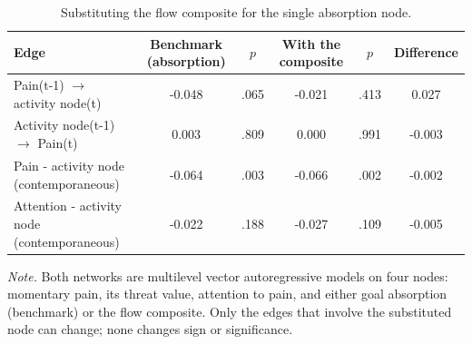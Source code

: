 \begin{table}[!htbp]
\raggedright
\caption{Substituting the flow composite for the single absorption node.}
\label{tab:sup-network}
\footnotesize
\begingroup
\setlength{\tabcolsep}{4pt}
\renewcommand{\arraystretch}{1.08}
\noindent
\begin{tabular*}{\textwidth}{@{\extracolsep{\fill}}lccccc@{}}
\toprule
Edge & Benchmark (absorption) & $p$ & With the composite & $p$  & Difference \\
\midrule
Pain(t-1) $\rightarrow$ activity node(t) & -0.048 & .065 & -0.021 & .413 & 0.027 \\
Activity node(t-1) $\rightarrow$ Pain(t) & 0.003 & .809 & 0.000 & .991 & -0.003 \\
Pain - activity node (contemporaneous) & -0.064 & .003 & -0.066 & .002 & -0.002 \\
Attention - activity node (contemporaneous) & -0.022 & .188 & -0.027 & .109 & -0.005 \\
\bottomrule
\end{tabular*}
\par\vspace{3pt}\noindent\parbox{\textwidth}{\footnotesize\textit{Note.} Both networks are multilevel vector autoregressive models on four nodes: momentary pain, its threat value, attention to pain, and either goal absorption (benchmark) or the flow composite. Only the edges that involve the substituted node can change; none changes sign or significance.}
\endgroup
\end{table}
